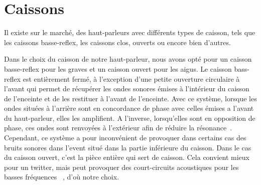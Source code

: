 \section{Caissons}

Il existe sur le marché, des haut-parleurs avec
différents types de caisson, tels que
les caissons basse-reflex, les caissons clos, ouverts ou encore bien d’autres.

Dans le choix du caisson de notre haut-parleur,
nous avons opté pour un caisson basse-reflex pour les graves
et un caisson ouvert pour les aigus.
Le caisson bass-reflex est entièrement fermé, à l'exception d'une petite ouverture circulaire  à l'avant qui permet de récupérer les ondes sonores émises à l'intérieur du caisson de l'enceinte et de les restituer à l'avant de l'enceinte.
Avec ce système, lorsque les ondes situées à l’arrière sont en concordance de phase
avec celles émises a l’avant du haut-parleur, elles les amplifient. A l'inverse,
lorsqu’elles sont en opposition de phase,
ces ondes sont renvoyées à l’extérieur afin de réduire la résonance~\cite{US6275597}.
Cependant, ce système a pour inconvénient de provoquer dans certains cas
des bruits sonores dans l’event situé dans la partie inférieure du caisson.
Dans le cas du caisson ouvert, c'est la pièce entière qui sert de caisson. Cela convient mieux pour un twitter, mais peut provoquer des court-circuits acoustiques pour les basses fréquences~\cite{petoin} , d'où notre choix.